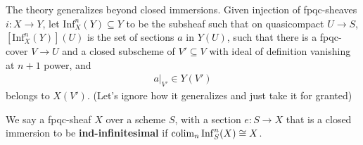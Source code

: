 The theory generalizes beyond closed immersions. Given injection of fpqc-sheaves $i:X\to Y$, let $\mathrm{Inf}_X^n(Y)\subseteq Y$ to be the subsheaf such that on quasicompact $U\to S$, $[\mathrm{Inf}_X^n(Y)](U)$ is the set of sections $a$ in $Y(U)$, such that there is a fpqc-cover $V\to U$ and a closed subscheme of $V'\subseteq V$ with ideal of definition vanishing at $n+1$ power, and 
\begin{align*}
   a|_{V'}\in  Y(V') 
\end{align*}belongs to $X(V')$. (Let's ignore how it generalizes and just take it for granted)

\begin{definition}
    We say a fpqc-sheaf $X$ over a scheme $S$, with a section $e:S\to X$ that is a closed immersion to be \textbf{ind-infinitesimal} if $\operatorname{colim}_n\mathrm{Inf}^n_S(X)\cong X$.
\end{definition}

